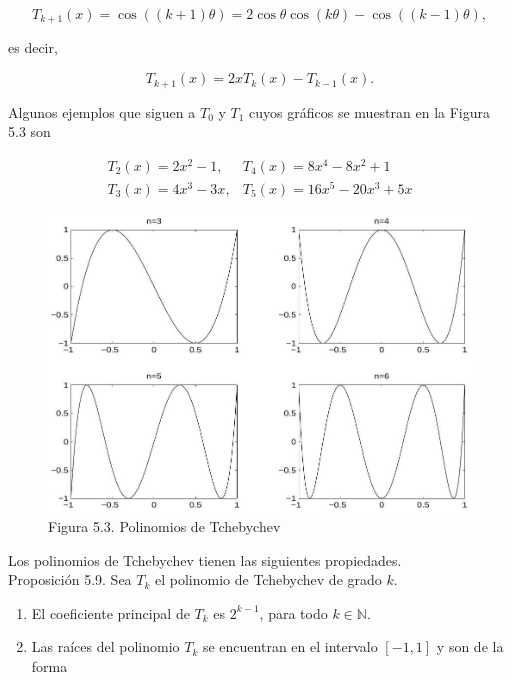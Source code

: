 \documentclass[10pt]{book}
\begin{document}
$$
T_{k+1}(x)=\cos ((k+1) \theta)=2 \cos \theta \cos (k \theta)-\cos ((k-1) \theta),
$$

es decir,


\begin{equation*}
T_{k+1}(x)=2 x T_{k}(x)-T_{k-1}(x) . \tag{5.5}
\end{equation*}


Algunos ejemplos que siguen a $T_{0}$ y $T_{1}$ cuyos gráficos se muestran en la Figura 5.3 son

$$
\begin{array}{ll}
T_{2}(x)=2 x^{2}-1, & T_{4}(x)=8 x^{4}-8 x^{2}+1 \\
T_{3}(x)=4 x^{3}-3 x, & T_{5}(x)=16 x^{5}-20 x^{3}+5 x
\end{array}
$$

\begin{figure}[h]
\begin{center}
  \includegraphics[width=\textwidth]{2025_09_05_3888c9ac96bd653d96b4g-102}
\captionsetup{labelformat=empty}
\caption{Figura 5.3. Polinomios de Tchebychev}
\end{center}
\end{figure}

Los polinomios de Tchebychev tienen las siguientes propiedades.\\
Proposición 5.9. Sea $T_{k}$ el polinomio de Tchebychev de grado $k$.

\begin{enumerate}
  \item El coeficiente principal de $T_{k}$ es $2^{k-1}$, para todo $k \in \mathbb{N}$.
  \item Las raíces del polinomio $T_{k}$ se encuentran en el intervalo $[-1,1]$ y son de la forma
\end{enumerate}
\end{document}
